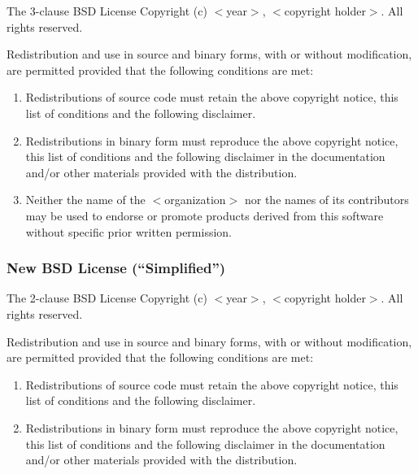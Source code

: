 \documentclass{beamer}
\begin{document}
\begin{frame}

\begin{block}{The 3-clause BSD License}
Copyright (c) $<$year$>$, $<$copyright holder$>$. All rights reserved.

Redistribution and use in source and binary forms, with or without
modification, are permitted provided that the following conditions are met:

\small

\begin{enumerate}
\item Redistributions of source code must retain the above copyright
      notice, this list of conditions and the following disclaimer.
\item Redistributions in binary form must reproduce the above copyright
      notice, this list of conditions and the following disclaimer in the
      documentation and/or other materials provided with the distribution.
\item Neither the name of the $<$organization$>$ nor the
      names of its contributors may be used to endorse or promote products
      derived from this software without specific prior written permission.
\end{enumerate}
 
\end{block}

\end{frame}


\begin{frame}
\frametitle{New BSD License (``Simplified'')}

\begin{block}{The 2-clause BSD License} 
Copyright (c) $<$year$>$, $<$copyright holder$>$. All rights reserved.

Redistribution and use in source and binary forms, with or without
modification, are permitted provided that the following conditions
are met:

\begin{enumerate}
\item Redistributions of source code must retain the above copyright notice, this list of  conditions and the following disclaimer.
\item Redistributions in binary form must reproduce the above copyright notice, this list of conditions and the following disclaimer in the documentation and/or other materials provided with the distribution.
\end{enumerate}
 
\end{block}

\end{frame}
\end{document}
